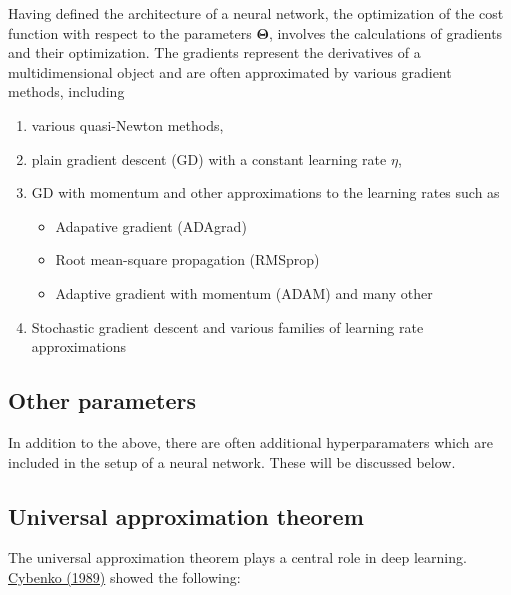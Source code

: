 \documentclass[%
oneside,                 %
final,                   %
10pt]{article}
\begin{document}
Having defined the architecture of a neural network, the optimization
of the cost function with respect to the parameters $\bm{\Theta}$,
involves the calculations of gradients and their optimization. The
gradients represent the derivatives of a multidimensional object and
are often approximated by various gradient methods, including
\begin{enumerate}
\item various quasi-Newton methods,

\item plain gradient descent (GD) with a constant learning rate $\eta$,

\item GD with momentum and other approximations to the learning rates such as
\begin{itemize}

  \item Adapative gradient (ADAgrad)

  \item Root mean-square propagation (RMSprop)

  \item Adaptive gradient with momentum (ADAM) and many other

\end{itemize}

\noindent
\item Stochastic gradient descent and various families of learning rate approximations
\end{enumerate}

\noindent
\subsection{Other parameters}

In addition to the above, there are often additional hyperparamaters
which are included in the setup of a neural network. These will be
discussed below.

\subsection{Universal approximation theorem}

The universal approximation theorem plays a central role in deep
learning.  \href{{https://link.springer.com/article/10.1007/BF02551274}}{Cybenko (1989)} showed
the following:
\end{document}
